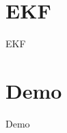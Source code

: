 \documentclass[xcolor=dvipsnames]{beamer}
\begin{document}
  \section{EKF}
  \begin{frame}{EKF}
    
  \end{frame}
  
  \section{Demo}
  \begin{frame}{Demo}
    
  \end{frame}
  
\end{document}
